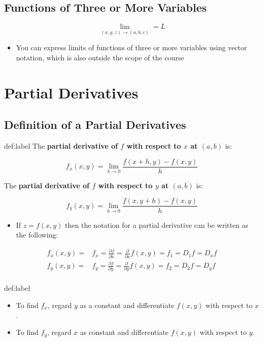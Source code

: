 \documentclass{package/notes}
\begin{document}
\subsection{Functions of Three or More Variables}

$$\lim_{(x,y,z)\to (a,b,c)} = L$$

\begin{itemize}
	\item You can express limits of functions of three or more variables using vector notation, which is also outside the scope of the course
\end{itemize}



\section{Partial Derivatives}

\subsection{Definition of a Partial Derivatives}

\begin{definition}{def:label}
	The \textbf{partial derivative of $f$ with respect to $x$ at $(a,b)$} is:

	$$f_x(x,y) = \lim_{h\to 0} \frac{f(x+h,y)-f(x,y)}{h}$$

	The \textbf{partial derivative of $f$ with respect to $y$ at $(a,b)$} is:

	$$f_y(x,y) = \lim_{h\to 0} \frac{f(x,y+h)-f(x,y)}{h}$$
\end{definition}

\begin{itemize}
	\item If $z = f(x,y)$ then the notation for a partial derivative can be written as the following:
\end{itemize}

$$
\begin{aligned}
	f_x(x,y) =& f_x = \frac{\partial f}{\partial x} = \frac{\partial}{\partial x}f(x,y)=f_1=D_1f=D_xf\\
	f_y(x,y) =& f_y = \frac{\partial f}{\partial y} = \frac{\partial}{\partial y}f(x,y)=f_2=D_2f=D_yf\\
\end{aligned}
$$

\begin{proposition}{def:label}
	\begin{itemize}
		\item To find $f_x$, regard $y$ as a constant and differentiate $f(x,y)$ with respect to $x$.
		\item To find $f_y$, regard $x$ as constant and differentiate $f(x,y)$ with respect to $y$.
	\end{itemize}
\end{proposition}
\end{document}
